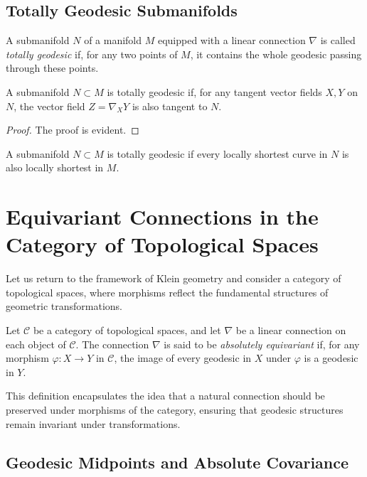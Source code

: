 \subsection{Totally Geodesic Submanifolds}

\begin{definition}
    A submanifold $N$ of a manifold $M$ equipped with a linear connection $\nabla$ is called \textit{totally geodesic} if, for any two points of $M$, it contains the whole geodesic passing through these points.
\end{definition}

\begin{lemma}
    A submanifold $N \subset M$ is totally geodesic if, for any tangent vector fields $X, Y$ on $N$, the vector field $Z = \nabla_X Y$ is also tangent to $N$.
\end{lemma}

\begin{proof}
    The proof is evident.
\end{proof}

\begin{remark}
    A submanifold $N \subset M$ is totally geodesic if every locally shortest curve in $N$ is also locally shortest in $M$.
\end{remark}

\section{Equivariant Connections in the Category of Topological Spaces}

Let us return to the framework of Klein geometry and consider a category of topological spaces, where morphisms reflect the fundamental structures of geometric transformations.

\begin{definition}
    Let $\mathcal{C}$ be a category of topological spaces, and let $\nabla$ be a linear connection on each object of $\mathcal{C}$. The connection $\nabla$ is said to be \textit{absolutely equivariant} if, for any morphism $\varphi: X \to Y$ in $\mathcal{C}$, the image of every geodesic in $X$ under $\varphi$ is a geodesic in $Y$.
\end{definition}

This definition encapsulates the idea that a natural connection should be preserved under morphisms of the category, ensuring that geodesic structures remain invariant under transformations.

\subsection{Geodesic Midpoints and Absolute Covariance}

